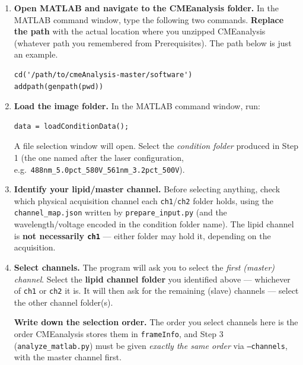 \documentclass[11pt]{article}
\newcommand{\code}[1]{\texttt{#1}}
\begin{document}
\begin{enumerate}[leftmargin=*]
    \item \textbf{Open MATLAB and navigate to the CMEanalysis folder.}
    In the MATLAB command window, type the following two commands.
    \textbf{Replace the path} with the actual location where you
    unzipped CMEanalysis (whatever path you remembered from
    Prerequisites). The path below is just an example.

    \begin{lstlisting}
cd('/path/to/cmeAnalysis-master/software')
addpath(genpath(pwd))
    \end{lstlisting}

    \item \textbf{Load the image folder.} In the MATLAB command
    window, run:

    \begin{lstlisting}
data = loadConditionData();
    \end{lstlisting}

    A file selection window will open. Select the \emph{condition
    folder} produced in Step 1 (the one named after the laser
    configuration, e.g.\
    \code{488nm\_5.0pct\_580V\_561nm\_3.2pct\_500V}).

    \item \textbf{Identify your lipid/master channel.} Before
    selecting anything, check which physical acquisition channel each
    \code{ch1}/\code{ch2} folder holds, using the
    \code{channel\_map.json} written by \code{prepare\_input.py} (and
    the wavelength/voltage encoded in the condition folder name). The
    lipid channel is \textbf{not necessarily \code{ch1}} --- either
    folder may hold it, depending on the acquisition.

    \item \textbf{Select channels.} The program will ask you to select
    the \emph{first (master) channel}. Select the \textbf{lipid
    channel folder} you identified above --- whichever of \code{ch1}
    or \code{ch2} it is. It will then ask for the remaining (slave)
    channels --- select the other channel folder(s).

    \begin{warnbox}
    \textbf{Write down the selection order.} The order you select
    channels here is the order CMEanalysis stores them in
    \code{frameInfo}, and Step 3 (\code{analyze\_matlab.py}) must be
    given \emph{exactly the same order} via \code{--channels}, with
    the master channel first.
    \end{warnbox}


\end{enumerate}
\end{document}
